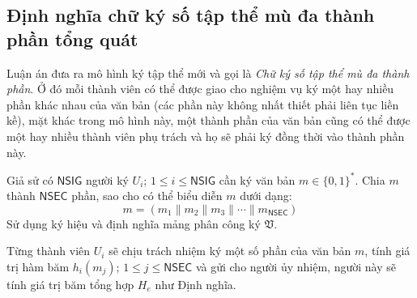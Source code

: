 \subsection{Định nghĩa chữ ký số tập thể mù đa thành phần tổng quát} \label{dnghiaTTMu}


Luận án đưa ra mô hình ký tập thể mới và gọi là \textit{Chữ ký số tập thể mù đa thành phần}. Ở đó mỗi thành viên có thể được giao cho nghiệm vụ ký một hay nhiều phần khác nhau của văn bản (các phần này không nhất thiết phải liên tục liền kề), mặt khác trong mô hình này, một thành phần của văn bản cũng có thể được một hay nhiều thành viên phụ trách và họ sẽ phải ký đồng thời vào thành phần này.

Giả sử có $\mathsf{NSIG}$ người ký $U_i$; $1\leqslant i\leqslant \mathsf{NSIG}$ cần ký văn bản $m \in  \{0,1\}^*$. Chia $m$ thành $\mathsf{NSEC}$ phần, sao cho có thể biểu diễn $m$ dưới dạng:\[  m= (m_1\parallel m_2\parallel m_3 \parallel \dotsm \parallel m_\mathsf{NSEC} ) \] Sử dụng ký hiệu và định nghĩa mảng phân công ký $\mathfrak{V}$.

Từng thành viên $U_i$ sẽ chịu trách nhiệm ký một số phần của văn bản $m$, tính giá trị hàm băm $h_i(m_j)$; $1\leqslant j\leqslant \mathsf{NSEC}$ và gửi cho người ủy nhiệm, người này sẽ tính giá trị băm tổng hợp $H_e$ như Định nghĩa. 
 
